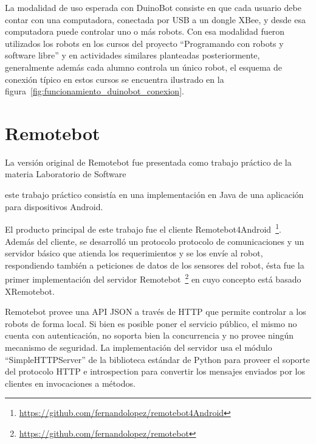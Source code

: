 La modalidad de uso esperada con DuinoBot consiste en que cada usuario
debe contar con una computadora, conectada por USB a un dongle XBee,
y desde esa computadora puede controlar uno o más robots. Con esa modalidad
fueron utilizados los robots en los cursos del proyecto
``Programando con robots y software libre'' y en actividades similares
planteadas posteriormente, generalmente además cada alumno controla
un único robot, el esquema de conexión típico en estos cursos se encuentra
ilustrado en la figura~\ref{fig:funcionamiento_duinobot_conexion}.

\section{Remotebot}\label{ch2:remotebot}

La versión original de Remotebot fue presentada como trabajo práctico
de la materia Laboratorio de Software

este trabajo práctico consistía
en una implementación en Java de una aplicación para dispositivos Android. 


El producto principal de este trabajo fue el cliente
Remotebot4Android~\footnote{\url{https://github.com/fernandolopez/remotebot4Android}}. Además del cliente, se desarrolló un protocolo protocolo de comunicaciones
y un servidor básico que atienda los requerimientos y se los envíe al
robot, respondiendo también a peticiones de datos de los sensores del
robot, ésta fue la primer implementación del servidor
Remotebot~\footnote{\url{https://github.com/fernandolopez/remotebot}}
en cuyo concepto está basado XRemotebot.

Remotebot provee una API JSON a través de HTTP que permite controlar a los
robots de forma local. Si bien es posible poner el servicio público,
el mismo no cuenta con autenticación, no soporta bien la concurrencia
y no provee ningún mecanismo de seguridad. La implementación del servidor
usa el módulo ``SimpleHTTPServer'' de la biblioteca estándar de Python para
proveer el soporte del protocolo HTTP e introspection para convertir los
mensajes enviados por los clientes en invocaciones a métodos.

